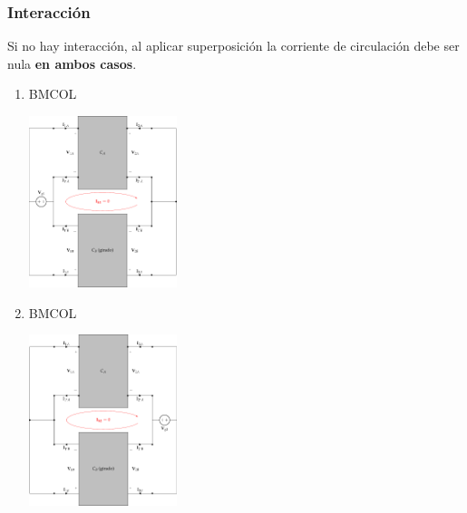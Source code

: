 \subsubsection{Interacción}
\label{sec:orgf1d8a5b}
Si no hay interacción, al aplicar superposición la corriente de circulación debe ser nula \textbf{en ambos casos}.
\begin{enumerate}
\item \hfill{}\textsc{BMCOL}
\label{sec:orgaa86e5c}
\begin{center}
\includegraphics[height=5cm]{../figs/paralelo-paralelo-superposicion-entrada.pdf}
\end{center}
\item \hfill{}\textsc{BMCOL}
\label{sec:org5b95701}
\begin{center}
\includegraphics[height=5cm]{../figs/paralelo-paralelo-superposicion-salida.pdf}
\end{center}
\end{enumerate}

